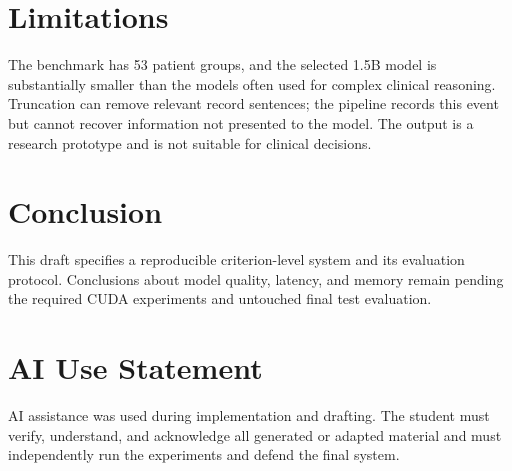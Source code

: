 \documentclass[conference]{IEEEtran}
\begin{document}
\section{Limitations}
The benchmark has 53 patient groups, and the selected 1.5B model is substantially
smaller than the models often used for complex clinical reasoning. Truncation can
remove relevant record sentences; the pipeline records this event but cannot recover
information not presented to the model. The output is a research prototype and is
not suitable for clinical decisions.

\section{Conclusion}
This draft specifies a reproducible criterion-level system and its evaluation
protocol. Conclusions about model quality, latency, and memory remain pending the
required CUDA experiments and untouched final test evaluation.

\section*{AI Use Statement}
AI assistance was used during implementation and drafting. The student must verify,
understand, and acknowledge all generated or adapted material and must independently
run the experiments and defend the final system.



\end{document}

